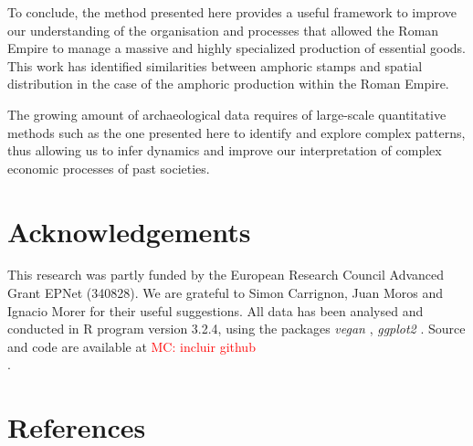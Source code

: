 \documentclass[review]{elsarticle}
\newcommand{\memo}[2]{\textcolor{#1}{#2}}
\newcommand{\maria}[1]{\memo{red}{MC: #1\\}}
\begin{document}
To conclude, the method presented here provides a useful framework to improve our understanding of the organisation and processes that allowed the Roman Empire to manage a massive and highly specialized production of essential goods. This work has identified similarities between amphoric stamps and spatial distribution in the case of the amphoric production within the Roman Empire.

The growing amount of archaeological data requires of large-scale quantitative methods such as the one presented here to identify and explore complex patterns, thus allowing us to infer dynamics and improve our interpretation of complex economic processes of past societies. 

\section{Acknowledgements}

This research was partly funded by the European Research Council Advanced Grant EPNet (340828). We are grateful to Simon Carrignon, Juan Moros and Ignacio Morer for their useful suggestions.  
All data has been analysed and conducted in R program version 3.2.4, using the packages \textit{vegan} \citep{oksanen_vegan_2007}, \textit{ggplot2} \citep{ggplot2:_2016}. Source and code are available at \maria{incluir github}. 

\section{References}

%

\end{document}
